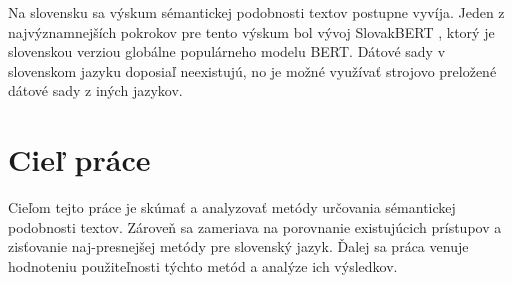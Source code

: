 \noindent
Na slovensku sa výskum sémantickej podobnosti textov postupne vyvíja. Jeden z najvýznamnejších pokrokov pre tento výskum bol vývoj SlovakBERT \cite{slovakbert_uvod2}, ktorý je slovenskou verziou globálne populárneho modelu BERT. Dátové sady v slovenskom jazyku doposiaľ neexistujú, no je možné využívať strojovo preložené dátové sady z iných jazykov.
\vspace{1em}

\section{Cieľ práce}
Cieľom tejto práce je skúmať a analyzovať metódy určovania sémantickej podobnosti textov. Zároveň sa zameriava na porovnanie existujúcich prístupov a zisťovanie naj-presnejšej metódy pre slovenský jazyk. Ďalej sa práca venuje hodnoteniu použiteľnosti týchto metód a analýze ich výsledkov.

